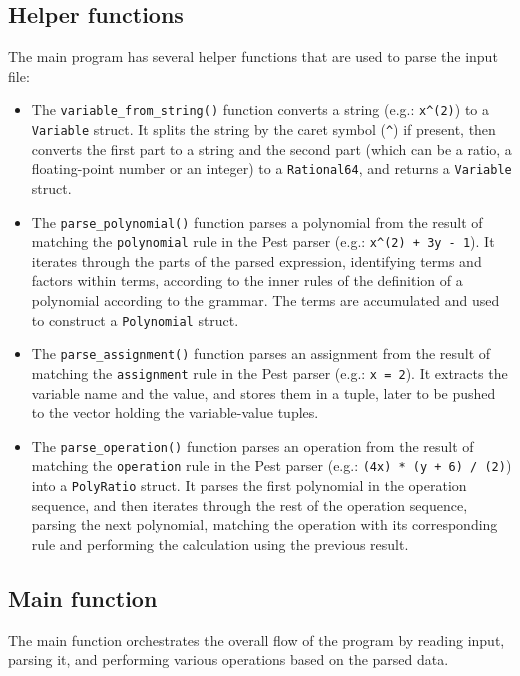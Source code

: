 \subsection{Helper functions}\label{subsec:helper-functions}

The main program has several helper functions that are used to parse the input file:

\begin{itemize}
    \item The \verb|variable_from_string()| function converts a string (e.g.: \verb|x^(2)|) to a \verb|Variable| struct. It splits the string by the caret symbol (\verb|^|) if present, then converts the first part to a string and the second part (which can be a ratio, a floating-point number or an integer) to a \verb|Rational64|, and returns a \verb|Variable| struct.
    \item The \verb|parse_polynomial()| function parses a polynomial from the result of matching the \verb|polynomial| rule in the Pest parser (e.g.: \verb|x^(2) + 3y - 1|). It iterates through the parts of the parsed expression, identifying terms and factors within terms, according to the inner rules of the definition of a polynomial according to the grammar. The terms are accumulated and used to construct a \verb|Polynomial| struct.
    \item The \verb|parse_assignment()| function parses an assignment from the result of matching the \verb|assignment| rule in the Pest parser (e.g.: \verb|x = 2|). It extracts the variable name and the value, and stores them in a tuple, later to be pushed to the vector holding the variable-value tuples.
    \item The \verb|parse_operation()| function parses an operation from the result of matching the \verb|operation| rule in the Pest parser (e.g.: \verb|(4x) * (y + 6) / (2)|) into a \verb|PolyRatio| struct. It parses the first polynomial in the operation sequence, and then iterates through the rest of the operation sequence, parsing the next polynomial, matching the operation with its corresponding rule and performing the calculation using the previous result.
\end{itemize}

\subsection{Main function}\label{subsec:main-function}

The main function orchestrates the overall flow of the program by reading input, parsing it, and performing various operations based on the parsed data.

